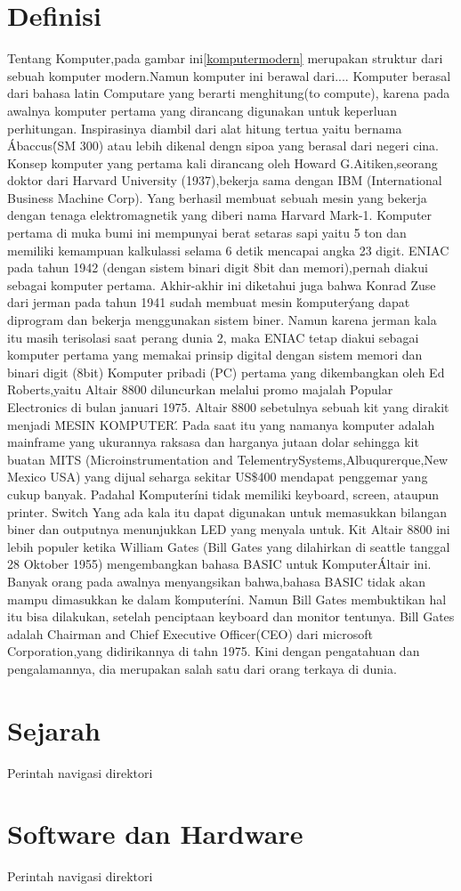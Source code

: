 \section{Definisi}
Tentang Komputer,pada gambar ini\ref{komputermodern} merupakan struktur dari sebuah komputer modern.Namun komputer ini berawal dari.... 
	Komputer berasal dari bahasa latin Computare yang berarti menghitung(to compute), karena pada awalnya komputer pertama yang dirancang digunakan untuk keperluan perhitungan. 
	Inspirasinya diambil dari alat hitung tertua yaitu bernama \'Abaccus\'(SM 300) atau lebih dikenal dengn sipoa yang berasal dari negeri cina.
	Konsep komputer yang pertama kali dirancang oleh Howard G.Aitiken,seorang doktor dari Harvard University (1937),bekerja sama dengan IBM (International Business Machine Corp). 
	Yang berhasil membuat sebuah mesin yang bekerja dengan tenaga elektromagnetik yang diberi nama Harvard Mark-1. 
	Komputer pertama di muka bumi ini mempunyai berat setaras sapi yaitu 5 ton dan memiliki kemampuan kalkulassi selama 6 detik mencapai angka 23 digit.
	ENIAC pada tahun 1942 (dengan sistem binari digit 8bit dan memori),pernah diakui sebagai komputer pertama. 
	Akhir-akhir ini diketahui juga bahwa Konrad Zuse dari jerman pada tahun 1941 sudah membuat mesin \'komputer\' yang dapat diprogram dan bekerja menggunakan sistem biner. 
	Namun karena jerman kala itu masih terisolasi saat perang dunia 2, maka ENIAC tetap diakui sebagai 
	komputer pertama yang memakai prinsip digital dengan sistem memori dan binari digit (8bit)
	Komputer pribadi (PC) pertama yang dikembangkan oleh Ed Roberts,yaitu Altair 8800 diluncurkan melalui promo majalah Popular Electronics di bulan januari 1975.
	Altair 8800 sebetulnya sebuah kit yang dirakit menjadi \'MESIN KOMPUTER\'. 
	Pada saat itu yang namanya komputer adalah mainframe yang ukurannya raksasa dan harganya jutaan dolar sehingga kit buatan MITS (Microinstrumentation and TelementrySystems,Albuqurerque,New Mexico USA) yang dijual seharga sekitar US\$400 mendapat penggemar yang cukup banyak.
	Padahal \'Komputer\' ini tidak memiliki keyboard, screen, ataupun printer. 
	Switch Yang ada kala itu dapat digunakan untuk memasukkan bilangan biner dan outputnya menunjukkan LED yang menyala untuk.
	Kit Altair 8800 ini lebih populer ketika William Gates (Bill Gates yang dilahirkan di seattle tanggal 28 Oktober 1955) mengembangkan bahasa BASIC untuk \'Komputer\' Altair ini. 
	Banyak orang pada awalnya menyangsikan bahwa,bahasa BASIC tidak akan mampu dimasukkan ke dalam \'komputer\' ini. 
	Namun Bill Gates membuktikan hal itu bisa dilakukan, setelah penciptaan keyboard dan monitor tentunya. 
	Bill Gates adalah Chairman and Chief Executive Officer(CEO) dari microsoft Corporation,yang didirikannya di tahn 1975.
	Kini dengan pengatahuan dan pengalamannya, dia merupakan salah satu dari orang terkaya di dunia.

\section{Sejarah}
Perintah navigasi direktori

\section{Software dan Hardware}
Perintah navigasi direktori

